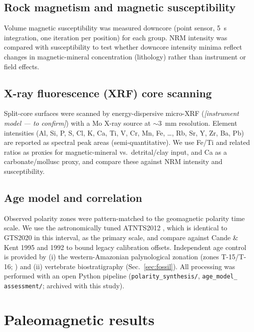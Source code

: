 \documentclass[11pt]{article}
\begin{document}
\subsection{Rock magnetism and magnetic susceptibility}
Volume magnetic susceptibility was measured downcore (point sensor,
\SI{5}{\second} integration, one iteration per position) for each group. NRM
intensity was compared with susceptibility to test whether downcore intensity
minima reflect changes in magnetic-mineral concentration (lithology) rather
than instrument or field effects.

\subsection{X-ray fluorescence (XRF) core scanning}
Split-core surfaces were scanned by energy-dispersive micro-XRF
(\textit{[instrument model --- to confirm]}) with a Mo X-ray source at
$\sim$\SI{3}{\milli\meter} resolution. Element intensities (Al, Si, P, S, Cl,
K, Ca, Ti, V, Cr, Mn, Fe, \ldots, Rb, Sr, Y, Zr, Ba, Pb) are reported as
spectral peak areas (semi-quantitative). We use Fe/Ti and related ratios as
proxies for magnetic-mineral vs.\ detrital/clay input, and Ca as a
carbonate/mollusc proxy, and compare these against NRM intensity and
susceptibility.

\subsection{Age model and correlation}
Observed polarity zones were pattern-matched to the geomagnetic polarity time
scale. We use the astronomically tuned ATNTS2012 \citep{Hilgen2012}, which is
identical to GTS2020 \citep{Raffi2020} in this interval, as the primary scale,
and compare against Cande \& Kent 1995 \citep{CandeKent1995} and 1992
\citep{CandeKent1992} to bound legacy calibration offsets. Independent age
control is provided by (i) the western-Amazonian palynological zonation
(zones T-15/T-16; \citealp{Jaramillo2011,Jaramillo2017}) and (ii) vertebrate
biostratigraphy (Sec.~\ref{sec:fossil}). All processing was performed with an
open Python pipeline (\texttt{polarity\_synthesis/}, \texttt{age\_model\_
assessment/}; archived with this study).

\section{Paleomagnetic results}
\end{document}
